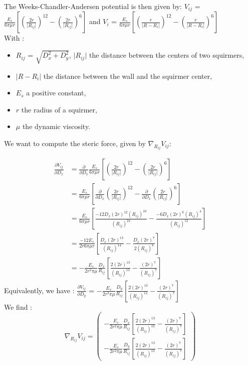 \documentclass{article}
\begin{document}
The Weeks-Chandler-Andersen potential is then given by:
$V_{ij}$ = $\frac{E_s}{6\pi\mu r}\left[\left(\frac{2r}{\lvert R_{ij}\rvert}\right)^{12} - \left(\frac{2r}{\lvert R_{ij}\rvert}\right)^6\right]$ and  $V_i$ = $\frac{E_s}{6\pi\mu r} \left[ \left( \frac{r}{\lvert R - R_i \rvert} \right)^{12} - \left( \frac{r}{\lvert R - R_i \rvert} \right) ^6 \right]$ 
\vspace{0,3cm}
\\With : \begin{itemize}
    \item $R_{ij}$ = $\sqrt{D_x^2+D_y^2}$, $\lvert R_{ij} \rvert$ the distance between the centers of two squirmers,
    \item $\lvert R - R_i\rvert$ the distance between the wall and the squirmer center,
    \item $E_s$ a positive constant,
    \item $r$ the radius of a squirmer,
    \item $\mu$ the dynamic viscosity.
\end{itemize}

\vspace{0,5cm}
We want to compute the steric force, given by $\nabla_{R_{ij}} V_{ij}$:

\begin{align*}
\frac{\partial V_{ij}}{\partial D_x} &= \frac{\partial}{\partial D_x}\frac{E_s}{6\pi\mu r}\left[\left(\frac{2r}{\lvert R_{ij}\rvert}\right)^{12} - \left(\frac{2r}{\lvert R_{ij}\rvert}\right)^6\right] \\
&= \frac{E_s}{6\pi\mu r} \left[\frac{\partial}{\partial D_x}\left(\frac{2r}{\lvert R_{ij}\rvert}\right)^{12} - \frac{\partial}{\partial D_x} \left(\frac{2r}{\lvert R_{ij}\rvert}\right)^6\right] \\
&= \frac{E_s}{6\pi\mu r} \left[ \frac{-12 D_x (2r)^{12}(R_{ij})^{10}}{(R_{ij})^{24}} - \frac{-6D_x(2r)^6(R_{ij})^4}{(R_{ij})^{12}}  \right] \\
&= \frac{-12 E_s}{2r6\pi\mu r} \left[ \frac{D_x (2r)^{13}}{(R_{ij})^{14}} - \frac{D_x (2r)^{7}}{2(R_{ij})^8}\right] \\
&= -\frac{E_s}{2r^2\pi\mu} \frac{D_x}{R_{ij}} \left[ \frac{2(2r)^{13}}{(R_{ij})^{13}} - \frac{(2r)^7}{(R_{ij})^{7}}\right]
\end{align*}
Equivalently, we have : 
$\frac{\partial V_{ij}}{\partial D_y}$ = $-\frac{E_s}{2r^2\pi\mu} \frac{D_y}{R_{ij}}\left[ \frac{2(2r)^{13}}{(R_{ij})^{13}} - \frac{(2r)^7}{(R_{ij})^7} \right]$
\\ We find : 
\begin{equation*}
    \boxed{\nabla_{R_{ij}} V_{ij} = 
    \begin{pmatrix}
        -\frac{E_s}{2r^2\pi\mu} \frac{D_x}{R_{ij}}\left[ \frac{2(2r)^{13}}{(R_{ij})^{13}} - \frac{(2r)^7}{(R_{ij})^7} \right] \\
        -\frac{E_s}{2r^2\pi\mu} \frac{D_y}{R_{ij}}\left[ \frac{2(2r)^{13}}{(R_{ij})^{13}} - \frac{(2r)^7}{(R_{ij})^7} \right]
    \end{pmatrix}}
\end{equation*}
\end{document}
